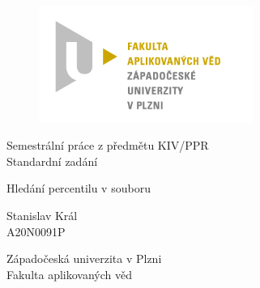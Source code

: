 \documentclass[12pt, a4paper]{article}
\begin{document}
	\renewcommand{\lstlistingname}{Ukázka kódu}
	\renewcommand{\lstlistlistingname}{Seznam ukázek kódu}
    \begin{titlepage}

        \centering

        \vspace*{\baselineskip}
        \begin{figure}[H]
        \centering
        \includegraphics[width=7cm]{img/fav-logo.jpg}
        \end{figure}

        \vspace*{1\baselineskip}

        \vspace{0.75\baselineskip}

        \vspace{0.5\baselineskip}
        {Semestrální práce z předmětu KIV/PPR\\}
        \vspace{4\baselineskip}
        {\sc Standardní zadání\\}

        {\LARGE\sc Hledání percentilu v souboru\\}

        \vspace{4\baselineskip}

        \vspace{0.5\baselineskip}

        {\sc\Large Stanislav Král \\}
        \vspace{0.5\baselineskip}
        {A20N0091P}

        \vfill

        {\sc Západočeská univerzita v Plzni\\
        Fakulta aplikovaných věd}

    \end{titlepage}

    \tableofcontents
    \pagebreak
\end{document}
